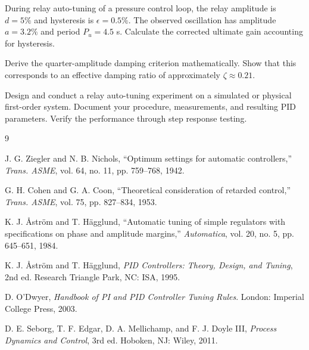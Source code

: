 \begin{exercise}
During relay auto-tuning of a pressure control loop, the relay amplitude is $d = 5\%$ and hysteresis is $\epsilon = 0.5\%$. The observed oscillation has amplitude $a = 3.2\%$ and period $P_u = 4.5$ s. Calculate the corrected ultimate gain accounting for hysteresis.
\end{exercise}

\begin{exercise}
Derive the quarter-amplitude damping criterion mathematically. Show that this corresponds to an effective damping ratio of approximately $\zeta \approx 0.21$.
\end{exercise}

\begin{exercise}
Design and conduct a relay auto-tuning experiment on a simulated or physical first-order system. Document your procedure, measurements, and resulting PID parameters. Verify the performance through step response testing.
\end{exercise}

\begin{thebibliography}{9}

J. G. Ziegler and N. B. Nichols, ``Optimum settings for automatic controllers,'' \textit{Trans. ASME}, vol. 64, no. 11, pp. 759--768, 1942.

G. H. Cohen and G. A. Coon, ``Theoretical consideration of retarded control,'' \textit{Trans. ASME}, vol. 75, pp. 827--834, 1953.

K. J. \AA{}str\"om and T. H\"agglund, ``Automatic tuning of simple regulators with specifications on phase and amplitude margins,'' \textit{Automatica}, vol. 20, no. 5, pp. 645--651, 1984.

K. J. \AA{}str\"om and T. H\"agglund, \textit{PID Controllers: Theory, Design, and Tuning}, 2nd ed. Research Triangle Park, NC: ISA, 1995.

D. O'Dwyer, \textit{Handbook of PI and PID Controller Tuning Rules}. London: Imperial College Press, 2003.

D. E. Seborg, T. F. Edgar, D. A. Mellichamp, and F. J. Doyle III, \textit{Process Dynamics and Control}, 3rd ed. Hoboken, NJ: Wiley, 2011.

\end{thebibliography}
